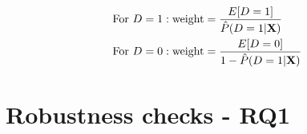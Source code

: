 \begin{equation}
    \label{eq:stabilisied_weights}
    \begin{aligned}
        \textnormal{For } D &= 1: \textnormal{weight} = \frac{E[D = 1]}{\hat{P}(D = 1 | \textbf{X})} \\
        \textnormal{For } D &= 0: \textnormal{weight} = \frac{E[D = 0]}{1 - \hat{P}(D = 1 | \textbf{X})}
    \end{aligned}
\end{equation}


\section{Robustness checks - RQ1}
